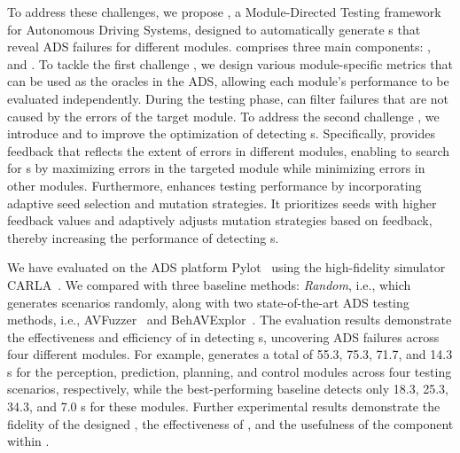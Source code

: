 To address these challenges, we propose \tool, a Module-Directed Testing framework for Autonomous Driving Systems, designed to automatically generate {\mccs}s that reveal ADS failures for different modules. \tool comprises three main components: \oracle, \feedback and \select. 
To tackle the first challenge , we design various module-specific metrics that can be used as the oracles in the ADS, allowing each module's performance to be evaluated independently. During the testing phase, \oracle can filter failures that are not caused by the errors of the target module. 
To address the second challenge , we introduce \feedback and \select to improve the optimization of detecting {\mccs}s. 
Specifically, \feedback provides feedback that reflects the extent of errors in different modules, enabling \tool to search for {\mccs}s by maximizing errors in the targeted module while minimizing errors in other modules. 
Furthermore, \select enhances testing performance by incorporating adaptive seed selection and mutation strategies. It prioritizes seeds with higher feedback values and adaptively adjusts mutation strategies based on feedback, thereby increasing the performance of detecting {\mccs}s.



We have evaluated \tool on the ADS platform Pylot~\cite{gog2021pylot} using the high-fidelity simulator CARLA~\cite{dosovitskiy2017carla}. 
We compared \tool with three baseline methods: \textit{Random}, i.e., which generates scenarios randomly, along with two state-of-the-art ADS testing methods, i.e., AVFuzzer~\cite{li2020av} and BehAVExplor~\cite{cheng2023behavexplor}. 
The evaluation results demonstrate the effectiveness and efficiency of \tool in detecting {\mccs}s, uncovering ADS failures across four different modules. 
For example, \tool generates a total of 55.3, 75.3, 71.7, and 14.3 {\mccs}s for the perception, prediction, planning, and control modules across four testing scenarios, respectively, while the best-performing baseline detects only 18.3, 25.3, 34.3, and 7.0 {\mccs}s for these modules.
Further experimental results demonstrate the fidelity of the designed \oracle, the effectiveness of \feedback, and the usefulness of the \select component within \tool.

